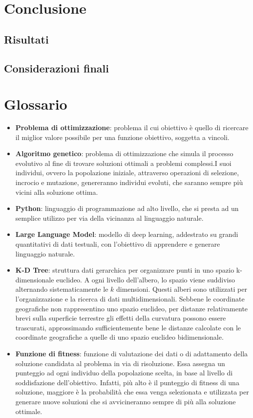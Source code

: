 \documentclass{CSUniSchoolLabReport}
\begin{document}
\pagebreak{}

\section{Conclusione}
\subsection{Risultati}
\subsection{Considerazioni finali}

\pagebreak{}
\section{Glossario}

\begin{itemize}
   \item \textbf{Problema di ottimizzazione}: problema il cui obiettivo è quello di ricercare il miglior valore possibile per una funzione obiettivo, soggetta a vincoli.
   \item \textbf{Algoritmo genetico}: problema di ottimizzazione che simula il processo evolutivo al fine di trovare soluzioni ottimali a problemi complessi.I suoi individui, ovvero la popolazione iniziale, attraverso operazioni di selezione, incrocio e mutazione, genereranno individui evoluti, che saranno sempre più vicini alla soluzione ottima.
   \item \textbf{Python}: linguaggio di programmazione ad alto livello, che si presta ad un semplice utilizzo per via della vicinanza al linguaggio naturale.
   \item \textbf{Large Language Model}: modello di deep learning, addestrato su grandi quantitativi di dati testuali, con l'obiettivo di apprendere e generare linguaggio naturale.
   \item \textbf{K-D Tree}: struttura dati gerarchica per organizzare punti in uno spazio k-dimensionale euclideo. A ogni livello dell'albero, lo spazio viene suddiviso alternando sistematicamente le $k$ dimensioni. Questi alberi sono utilizzati per l'organizzazione e la ricerca di dati multidimensionali. Sebbene le coordinate geografiche non rappresentino uno spazio euclideo, per distanze relativamente brevi sulla superficie terrestre gli effetti della curvatura possono essere trascurati, approssimando sufficientemente bene le distanze calcolate con le coordinate geografiche a quelle di uno spazio euclideo bidimensionale.
   \item \textbf{Funzione di fitness}: funzione di valutazione dei dati o di adattamento della soluzione candidata al problema in via di risoluzione. Essa assegna un punteggio ad ogni individuo della popolazione scelta, in base al livello di soddisfazione dell'obiettivo. Infatti, più alto è il punteggio di fitness di una soluzione, maggiore è la probabilità che essa venga selezionata e utilizzata per generare nuove soluzioni che si avvicineranno sempre di più alla soluzione ottimale.
\end{itemize}
\end{document}
